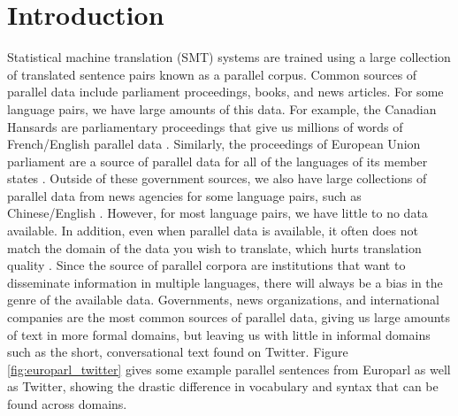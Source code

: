 \chapter{Introduction}
\label{chap:intro}

Statistical machine translation (SMT) systems are trained using a large collection of translated
sentence pairs known as a parallel corpus. Common sources of parallel data include
parliament proceedings, books, and news articles.
For some language pairs, we have large amounts of this data. For example, the Canadian
Hansards are parliamentary proceedings that give us millions of words of
French/English parallel data \citep{Germann01}. Similarly, the proceedings of
European Union parliament are a source of parallel data for all of the languages
of its member states \citep{Koehn05}.
Outside of these government sources, we
also have large collections of parallel data from news agencies for some
language pairs, such as Chinese/English \citep{Ma05}.
However, for most language pairs, we have little to no data available.
In addition, even when parallel
data is available, it often does not match the domain of the data you wish to
translate, which hurts translation quality \citep{Munteanu05}.
Since the source of parallel corpora are institutions that want to disseminate
information in multiple languages, there will always be a bias in the genre of
the available data. Governments, news organizations, and international companies
are the most common sources of parallel data, giving us large amounts of text in
more formal domains, but leaving us with little in informal domains such as the
short, conversational text found on Twitter. 
Figure \ref{fig:europarl_twitter} gives some example parallel sentences from
Europarl as well as Twitter, showing the drastic difference in vocabulary and
syntax that can be found across domains.

